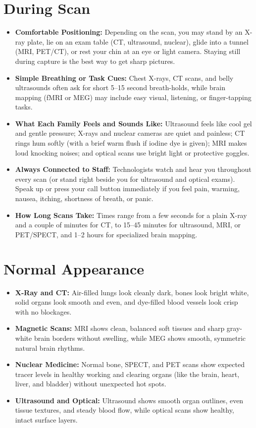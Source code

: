 \section{During Scan}
\begin{itemize}
  \item \textbf{Comfortable Positioning:} Depending on the scan, you may stand by an X-ray plate, lie on an exam table (CT, ultrasound, nuclear), glide into a tunnel (MRI, PET/CT), or rest your chin at an eye or light camera. Staying still during capture is the best way to get sharp pictures.
  \item \textbf{Simple Breathing or Task Cues:} Chest X-rays, CT scans, and belly ultrasounds often ask for short 5--15 second breath-holds, while brain mapping (fMRI or MEG) may include easy visual, listening, or finger-tapping tasks.
  \item \textbf{What Each Family Feels and Sounds Like:} Ultrasound feels like cool gel and gentle pressure; X-rays and nuclear cameras are quiet and painless; CT rings hum softly (with a brief warm flush if iodine dye is given); MRI makes loud knocking noises; and optical scans use bright light or protective goggles.
  \item \textbf{Always Connected to Staff:} Technologists watch and hear you throughout every scan (or stand right beside you for ultrasound and optical exams). Speak up or press your call button immediately if you feel pain, warming, nausea, itching, shortness of breath, or panic.
  \item \textbf{How Long Scans Take:} Times range from a few seconds for a plain X-ray and a couple of minutes for CT, to 15--45 minutes for ultrasound, MRI, or PET/SPECT, and 1--2 hours for specialized brain mapping.
\end{itemize}

\section{Normal Appearance}
\begin{itemize}
  \item \textbf{X-Ray and CT:} Air-filled lungs look cleanly dark, bones look bright white, solid organs look smooth and even, and dye-filled blood vessels look crisp with no blockages.
  \item \textbf{Magnetic Scans:} MRI shows clean, balanced soft tissues and sharp gray-white brain borders without swelling, while MEG shows smooth, symmetric natural brain rhythms.
  \item \textbf{Nuclear Medicine:} Normal bone, SPECT, and PET scans show expected tracer levels in healthy working and clearing organs (like the brain, heart, liver, and bladder) without unexpected hot spots.
  \item \textbf{Ultrasound and Optical:} Ultrasound shows smooth organ outlines, even tissue textures, and steady blood flow, while optical scans show healthy, intact surface layers.
\end{itemize}

